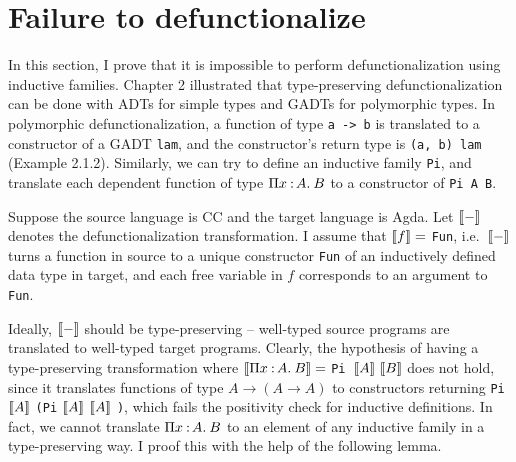 \section{Failure to defunctionalize}
\label{sec:3.2}

In this section, I prove that it is impossible to perform defunctionalization using inductive families. Chapter 2 illustrated that type-preserving defunctionalization can be done with ADTs for simple types and GADTs for polymorphic types. In polymorphic defunctionalization, a function of type \texttt{a -> b} is translated to a constructor of a GADT \texttt{lam}, and the constructor's return type is \texttt{(a, b) lam} (Example 2.1.2). Similarly, we can try to define an inductive family \texttt{Pi}, and translate each dependent function of type $\Pi x\mkern1.5mu{\hspace{0.5mm}{:}\hspace{0.5mm}} A.\hspace{0.8mm}B$ to a constructor of \texttt{Pi A B}. 

Suppose the source language is CC and the target language is Agda. Let ${[\![ - ]\!]}$ denotes the defunctionalization transformation. I assume that ${[\![ f ]\!]} =$ \texttt{Fun}, i.e.~${[\![ - ]\!]}$ turns a function in source to a unique constructor \texttt{Fun} of an inductively defined data type in target, and each free variable in $f$ corresponds to an argument to \texttt{Fun}. 

Ideally, ${[\![ - ]\!]}$ should be type-preserving -- well-typed source programs are translated to well-typed target programs. Clearly, the hypothesis of having a type-preserving transformation where ${[\![ \Pi x\mkern1.5mu{\hspace{0.5mm}{:}\hspace{0.5mm}} A.\hspace{0.8mm}B ]\!]} =$ \texttt{Pi }$\bbracket{A}\ \bbracket{B}$ does not hold, since it translates functions of type $A \rightarrow (A \rightarrow A)$ to constructors returning \texttt{Pi} ${[\![ A ]\!]}$ \texttt{(Pi} ${[\![ A ]\!]}$ ${[\![ A ]\!]}$ \texttt{)}, which fails the positivity check for inductive definitions. In fact, we cannot translate $\Pi x\mkern1.5mu{\hspace{0.5mm}{:}\hspace{0.5mm}} A.\hspace{0.8mm}B$ to an element of any inductive family in a type-preserving way. I proof this with the help of the following lemma.

